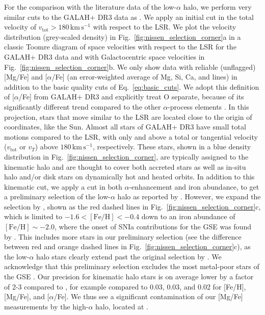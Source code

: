 \documentclass[fleqn,usenatbib]{mnras}
\newcommand{\added}[1]{#1}
\newcommand{\kms}{\,\mathrm{km\,s^{-1}}}	%
\begin{document}
For the comparison with the literature data of the low-$\alpha$ halo, we perform very similar cuts to the GALAH+ DR3 data as \cite{Nissen2010}. We apply an initial cut in the total velocity of $v_\text{tot} > 180\kms$ with respect to the LSR. We plot the velocity distribution (grey-scaled density) in Fig.~\ref{fig:nissen_selection_corner}a in a classic Toomre diagram of space velocities with respect to the LSR for the GALAH+ DR3 data and with Galactocentric space velocities in Fig.~\ref{fig:nissen_selection_corner}b. We only show data with reliable (unflagged) [Mg/Fe] and [$\alpha$/Fe] (an error-weighted average of Mg, Si, Ca, and \added{ lines}) in addition to the basic quality cuts of Eq.~\ref{eq:basic_cuts}. \added{We adopt this definition of [$\alpha$/Fe] from GALAH+ DR3 and explicitly treat O separate, because of its significantly different trend compared to the other $\alpha$-process elements \citep[see][for a detailed discussion]{Buder2018}}. In this projection, stars that move similar to the LSR are located close to the origin of coordinates, like the Sun. Almost all stars of GALAH+ DR3 have small total motions compared to the LSR, with only  and  above a total or tangential velocity ($v_\text{tot}$ or $v_T$) above $180\kms$, respectively. These stars, shown in a blue density distribution in Fig.~\ref{fig:nissen_selection_corner}, are typically assigned to the kinematic halo \citep[e.g.][]{Venn2004} and are thought to cover both accreted stars as well as in-situ halo and/or disk stars on dynamically hot and heated orbits.
In addition to this kinematic cut, we apply a cut in both $\alpha$-enhancement and iron abundance, to get a preliminary selection of the low-$\alpha$ halo as reported by \citet{Nissen2010}. However, we expand the selection by \citet{Nissen2010}, shown as the red dashed lines in Fig.~\ref{fig:nissen_selection_corner}c, which is limited to $-1.6 < \mathrm{[Fe/H]} < -0.4$ down to an iron abundance of $\mathrm{[Fe/H]} \sim -2.0$, where the onset of SNIa contributions for the GSE was found by \citet{Matsuno2019}. This includes more stars in our preliminary selection (see the difference between red and orange dashed lines in Fig.~\ref{fig:nissen_selection_corner}c), as the low-$\alpha$ halo stars clearly extend past the original selection by \citet{Nissen2010}. We acknowledge that this preliminary selection excludes the most metal-poor stars of the GSE \citep{Cordoni2021}. Our precision for kinematic halo stars is on average lower by a factor of 2-3 compared to \citet{Nissen2010}, for example \protect compared to 0.03, 0.03, and 0.02 for [Fe/H], [Mg/Fe], and [$\alpha$/Fe]. We thus see a significant contamination of our [Mg/Fe] measurements by the high-$\alpha$ halo, located at . 
\end{document}
